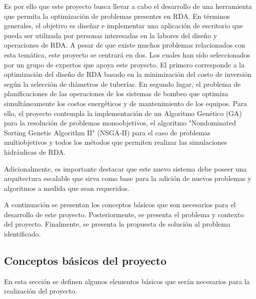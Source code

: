\documentclass[11pt,letterpaper]{article}
\begin{document}
Es por ello que este proyecto busca llevar a cabo el desarrollo de una herramienta que permita la optimización de problemas presentes en RDA. En términos generales, el objetivo es diseñar e implementar una aplicación de escritorio que pueda ser utilizada por personas interesadas en la labores del diseño y operaciones de RDA. A pesar de que existe muchos problemas relacionados con esta temática, este proyecto se centrará en dos. Los cuales han sido seleccionados por un grupo de expertos que apoya este proyecto. El primero corresponde a la optimización del diseño de RDA basado en la minimización del costo de inversión según la selección de diámetros de tuberías. En segundo lugar, el problema de planificaciones de las operaciones de los sistemas de bombeo que optimiza simultáneamente los costos energéticos y de mantenimiento de los equipos. Para ello, el proyecto contempla la implementación de un Algoritmo Genético (GA) \cite{Heiss-Czedik1997} para la resolución de problemas monoobjetivos, el algoritmo  "Nondominated Sorting Genetic Algorithm II" (NSGA-II) \cite{Deb2002} para el caso de problemas multiobjetivos y todos los métodos que permiten realizar las simulaciones hidráulicas de RDA.

Adicionalmente, es importante destacar que este nuevo sistema debe poseer una arquitectura escalable que sirva como base para la adición de nuevos problemas y algoritmos a medida que sean requeridos.

A continuación se presentan los conceptos básicos que son necesarios para el desarrollo de este proyecto. Posteriormente, se presenta el problema y contexto del proyecto. Finalmente, se presenta la propuesta de solución al problema identificado.

\subsection{Conceptos básicos del proyecto} 

En esta sección se definen algunos elementos básicos que serán necesarios para la realización del proyecto.
\end{document}
